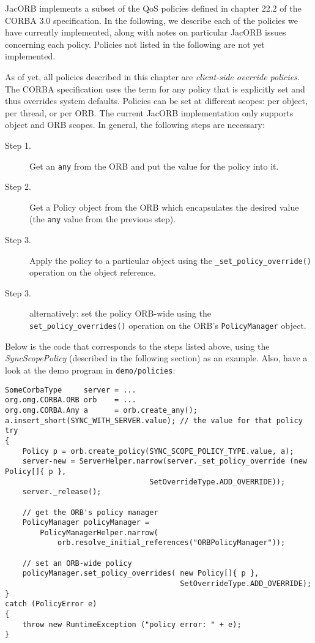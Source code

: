 
JacORB implements a subset of the QoS policies defined in chapter
22.2 of the CORBA 3.0 specification.  In the following, we describe
each of the policies we have currently implemented, along with notes
on particular JacORB issues concerning each policy.  Policies not
listed in the following are not yet implemented.

As of yet, all policies described in this chapter are
\emph{client-side override policies}. The CORBA specification uses the
term for any policy that is explicitly set and thus overrides system
defaults. Policies can be set at different scopes: per object, per
thread, or per ORB. The current JacORB implementation only supports
object and ORB scopes. In general, the following steps are necessary:

\begin{description}
\item[Step 1.] Get an {\tt any} from the ORB and put the value for the
           policy into it.
\item[Step 2.] Get a Policy object from the ORB which encapsulates the
           desired value (the {\tt any} value from the previous step).
\item[Step 3.]  Apply the policy to a particular object using the
           {\tt \_set\_policy\_override()} operation on the object
           reference.
\item[Step 3.] alternatively: set the policy ORB-wide using the {\tt
           set\_policy\_overrides()} operation on the ORB's
           {\tt PolicyManager} object.
\end{description}

Below is the code that corresponds to the steps listed above, using the
\emph{SyncScopePolicy} (described in the following section) as an
example. Also, have a look at the demo program in {\tt demo/policies}:

\begin{verbatim}
SomeCorbaType     server = ...
org.omg.CORBA.ORB orb    = ...
org.omg.CORBA.Any a      = orb.create_any();
a.insert_short(SYNC_WITH_SERVER.value); // the value for that policy
try
{
    Policy p = orb.create_policy(SYNC_SCOPE_POLICY_TYPE.value, a);
    server-new = ServerHelper.narrow(server._set_policy_override (new Policy[]{ p },
                                 SetOverrideType.ADD_OVERRIDE));
    server._release();

    // get the ORB's policy manager
    PolicyManager policyManager =
        PolicyManagerHelper.narrow(
            orb.resolve_initial_references("ORBPolicyManager"));

    // set an ORB-wide policy
    policyManager.set_policy_overrides( new Policy[]{ p },
                                        SetOverrideType.ADD_OVERRIDE);
}
catch (PolicyError e)
{
    throw new RuntimeException ("policy error: " + e);
}
\end{verbatim}

